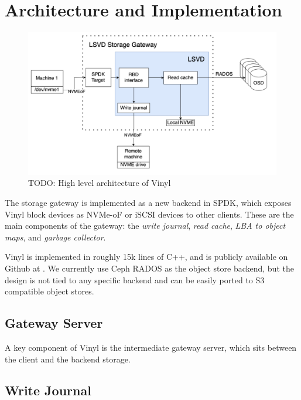 \section{Architecture and Implementation} \label{sec:architecture}

\begin{figure}
	\centering
	\includegraphics[width=1\linewidth]{figs/lsvd-highlv-arch.png}
	\caption[short]{TODO: High level architecture of Vinyl}
\end{figure}

The storage gateway is implemented as a new backend in SPDK, which exposes
Vinyl block devices as NVMe-oF or iSCSI devices to other clients. These are the
main components of the gateway: the \textit{write journal}, \textit{read cache},
\textit{LBA to object maps}, and \textit{garbage collector}.

Vinyl is implemented in roughly 15k lines of C++, and is publicly available on
Github at . We currently use
Ceph RADOS as the object store backend, but the design is not tied to any
specific backend and can be easily ported to S3 compatible object stores.

\subsection{Gateway Server}

A key component of Vinyl is the intermediate gateway server, which sits between
the client and the backend storage.


\subsection{Write Journal}

